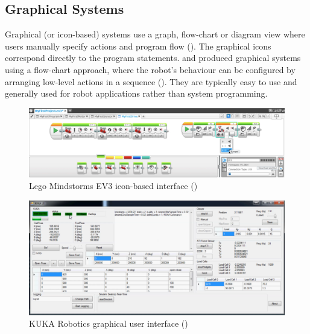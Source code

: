 
\subsection{Graphical Systems}\label{sssec:Graphical systems}
Graphical (or icon-based) systems use a graph, flow-chart or diagram view where users manually specify actions and program flow ().
The graphical icons correspond directly to the program statements.
\cite{lego2003} and \cite{bischoff2002morpha} produced graphical systems using a flow-chart approach, where the robot's behaviour can be configured by arranging low-level actions in a sequence ().
They are typically easy to use and generally used for robot applications rather than system programming. 

\begin{figure}[!h]
	\centering
	\includegraphics[width=\linewidth]{figures/lego-mindstorm2}
	\caption{Lego Mindstorms EV3 icon-based interface (\cite{lego2003})}
	\label{fig:lego-mindstorm}
\end{figure} 
\begin{figure}[!h]
	\centering
	\includegraphics[width=\linewidth]{figures/kuka-interface2}
	\caption{KUKA Robotics graphical user interface (\cite{abdeetedal2017kuka})}
	\label{fig:Kuka}
\end{figure} 


